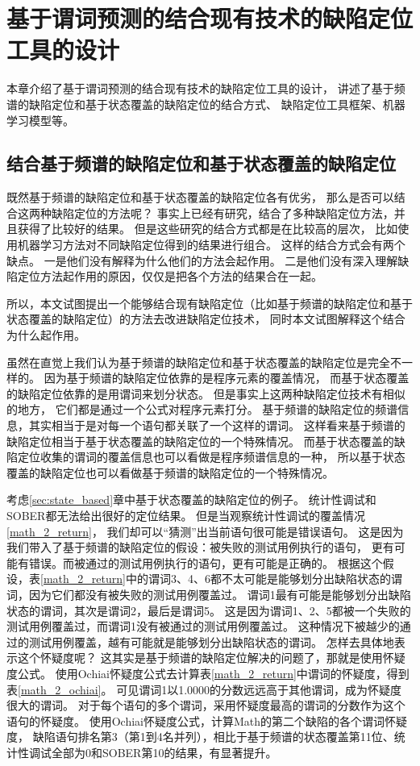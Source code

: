\chapter{基于谓词预测的结合现有技术的缺陷定位工具的设计}

本章介绍了基于谓词预测的结合现有技术的缺陷定位工具的设计，
讲述了基于频谱的缺陷定位和基于状态覆盖的缺陷定位的结合方式、
缺陷定位工具框架、机器学习模型等。

\section{结合基于频谱的缺陷定位和基于状态覆盖的缺陷定位}
\label{sec:approach_comb}

既然基于频谱的缺陷定位和基于状态覆盖的缺陷定位各有优劣，
那么是否可以结合这两种缺陷定位的方法呢？
事实上已经有研究\parencite{Le2016A,Xuan2014Learning}，结合了多种缺陷定位方法，并且获得了比较好的结果。
但是这些研究的结合方式都是在比较高的层次，
比如使用机器学习方法对不同缺陷定位得到的结果进行组合。
这样的结合方式会有两个缺点。
一是他们没有解释为什么他们的方法会起作用。
二是他们没有深入理解缺陷定位方法起作用的原因，仅仅是把各个方法的结果合在一起。

所以，本文试图提出一个能够结合现有缺陷定位（比如基于频谱的缺陷定位和基于状态覆盖的缺陷定位）的方法去改进缺陷定位技术，
同时本文试图解释这个结合为什么起作用。

虽然在直觉上我们认为基于频谱的缺陷定位和基于状态覆盖的缺陷定位是完全不一样的。
因为基于频谱的缺陷定位依靠的是程序元素的覆盖情况，
而基于状态覆盖的缺陷定位依靠的是用谓词来划分状态。
但是事实上这两种缺陷定位技术有相似的地方，
它们都是通过一个公式对程序元素打分。
基于频谱的缺陷定位的频谱信息，其实相当于是对每一个语句都关联了一个这样的谓词。
这样看来基于频谱的缺陷定位相当于基于状态覆盖的缺陷定位的一个特殊情况。
而基于状态覆盖的缺陷定位收集的谓词的覆盖信息也可以看做是程序频谱信息的一种，
所以基于状态覆盖的缺陷定位也可以看做基于频谱的缺陷定位的一个特殊情况。

考虑\ref{sec:state_based}章中基于状态覆盖的缺陷定位的例子。
统计性调试和SOBER都无法给出很好的定位结果。
但是当观察统计性调试的覆盖情况\ref{math_2_return}，
我们却可以“猜测”出当前语句很可能是错误语句。
这是因为我们带入了基于频谱的缺陷定位的假设：被失败的测试用例执行的语句，
更有可能有错误。而被通过的测试用例执行的语句，更有可能是正确的。
根据这个假设，表\ref{math_2_return}中的谓词3、4、6都不太可能是能够划分出缺陷状态的谓词，因为它们都没有被失败的测试用例覆盖过。
谓词1最有可能是能够划分出缺陷状态的谓词，其次是谓词2，最后是谓词5。
这是因为谓词1、2、5都被一个失败的测试用例覆盖过，而谓词1没有被通过的测试用例覆盖过。
这种情况下被越少的通过的测试用例覆盖，越有可能就是能够划分出缺陷状态的谓词。
怎样去具体地表示这个怀疑度呢？
这其实是基于频谱的缺陷定位解决的问题了，那就是使用怀疑度公式。
使用Ochiai怀疑度公式去计算表\ref{math_2_return}中谓词的怀疑度，得到表\ref{math_2_ochiai}。
可见谓词1以1.0000的分数远远高于其他谓词，成为怀疑度很大的谓词。
对于每个语句的多个谓词，采用怀疑度最高的谓词的分数作为这个语句的怀疑度。
使用Ochiai怀疑度公式，计算Math的第二个缺陷的各个谓词怀疑度，
缺陷语句排名第3（第1到4名并列），相比于基于频谱的状态覆盖第11位、统计性调试全部为0和SOBER第10的结果，有显著提升。

